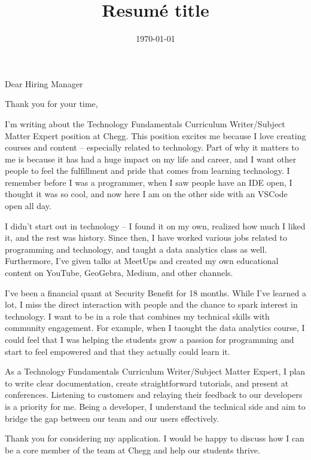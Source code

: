\documentclass[11pt,a4paper,sans]{moderncv}        %
\title{Resumé title}
\begin{document}
\newcommand{\hiringmanager}{Hiring Manager}
\newcommand{\position}{Technology Fundamentals Curriculum Writer/Subject Matter Expert}
\newcommand{\company}{Chegg}

\recipient{\hiringmanager{}}{Chegg}
\date{\today}
\opening{Dear \hiringmanager{}}
\closing{Thank you for your time,}
\makelettertitle

I'm writing about the \position{} position at \company{}. This
position excites me because I love creating courses and content --
especially related to technology.  Part of why it matters to me is
because it has had a huge impact on my life and career, and I want
other people to feel the fulfillment and pride that comes from
learning technology. I remember before I was a programmer, when I
saw people have an IDE open, I thought it was so cool, and now
here I am on the other side with an VSCode open all day.

I didn't start out in technology -- I found it on my own, realized
how much I liked it, and the rest was history.  Since then, I have
worked various jobs related to programming and technology, and taught
a data analytics class as well. Furthermore, I've given talks at MeetUps
and created my own educational content on YouTube, GeoGebra, Medium,
and other channels.

I've been a financial quant at Security Benefit for 18 months. While I've learned
a lot, I miss the direct interaction with people and the chance to spark interest
in technology. I want to be in a role that combines my technical skills with
community engagement.  For example, when I taought the data analytics
course, I could feel that I was helping the students grow a passion for
programming and start to feel empowered and that they actually could learn
it.

As a \position{}, I plan to write clear documentation, create straightforward
tutorials, and present at conferences. Listening to customers and relaying their
feedback to our developers is a priority for me. Being a developer, I understand
the technical side and aim to bridge the gap between our team and our users effectively.

Thank you for considering my application. I would be happy to discuss
how I can be a core member of the team at Chegg and help our students
thrive.

\vspace{0.5cm}


\makeletterclosing
\end{document}
